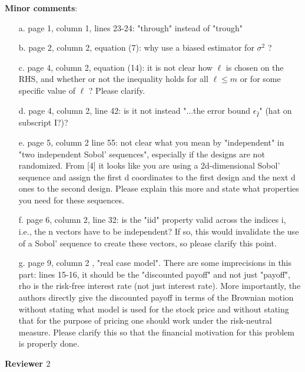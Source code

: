 \documentclass[10pt,a4paper]{article}
\begin{document}
\textbf{Minor comments}:
\begin{itemize}
\item[a.] page 1, column 1, lines 23-24: "through" instead of "trough"
\item[b.] page 2, column 2, equation (7): why use a biased estimator for $\sigma^2$ ?
\item[c.] page 4, column 2, equation (14): it is not clear how $\ell$ is chosen on the RHS, and whether or not the inequality holds for all $\ell \leq m$ or for some specific value of $\ell$ ? Please clarify.
\item[d.] page 4, column 2, line 42: is it not instead "...the error bound $\epsilon_{\hat{I}}$" (hat on subscript I?)?
\item[e.] page 5, column 2 line 55: not clear what you mean by "independent" in "two independent Sobol' sequences", especially if the designs are not randomized. From [4] it looks like you are using a 2d-dimensional Sobol' sequence and assign the first d coordinates to the first design and the next d ones to the second design. Please explain this more and state what properties you need for these sequences.
\item[f.] page 6, column 2, line 32: is the "iid" property valid across the indices i, i.e., the n vectors have to be independent? If so, this would invalidate the use of a Sobol' sequence to create these vectors, so please clarify this point.
\item[g.] page 9, column 2 , "real case model". There are some imprecisions in this part: lines 15-16, it should be the "discounted payoff" and not just "payoff", rho is the risk-free interest rate (not just interest rate). More importantly, the authors directly give the discounted payoff in terms of the Brownian motion without stating what model is used for the stock price and without stating that for the purpose of pricing one should work under the risk-neutral measure. Please clarify this so that the financial motivation for this problem is properly done.
\end{itemize}

\textbf{\large{Reviewer $2$}}
\vspace*{0.5cm}
\end{document}
